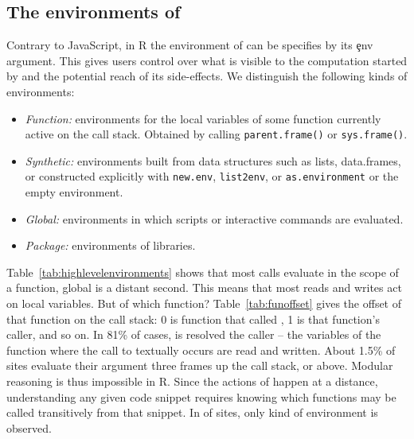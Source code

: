 \documentclass[screen,acmsmall]{acmart}%
\newcommand{\code}[1]{\lstinline |#1|\xspace}
\begin{document}
\subsection{The environments of \eval}\label{sec:env}

Contrary to JavaScript, in R the environment of \eval can be specifies by its
\c{env} argument. This gives users control over what is visible to the
computation started by \eval and the potential reach of its side-effects. We
distinguish the following kinds of environments:

\begin{itemize}[---]
\item \emph{Function:} environments for the local variables of some function
  currently active on the call stack. Obtained by calling \code{parent.frame()} or
  \code{sys.frame()}.
\item \emph{Synthetic:} environments built from data structures such as lists,
  data.frames, or constructed explicitly with \code{new.env}, \code{list2env}, or
  \code{as.environment} or the empty environment.
\item \emph{Global:} environments in which scripts or interactive commands are
  evaluated.
\item \emph{Package:} environments of libraries.
\end{itemize}


Table~\ref{tab:highlevelenvironments} shows that most calls evaluate in the
scope of a function, global is a distant second. This means that most reads and
writes act on local variables. But of which function? Table~\ref{tab:funoffset}
gives the offset of that function on the call stack: 0 is function that called
\eval, 1 is that function's caller, and so on. In 81\% of cases, \eval is
resolved the caller -- the variables of the function where the call to \eval
textually occurs are read and written. About 1.5\% of sites evaluate their
argument three frames up the call stack, or above. Modular reasoning is thus
impossible in R. Since the actions of \eval happen at a distance, understanding
any given code snippet requires knowing which functions may be called
transitively from that snippet. In \packageNbOneCategoryEnvirSitePercent of
sites, only kind of environment is observed.
\end{document}
